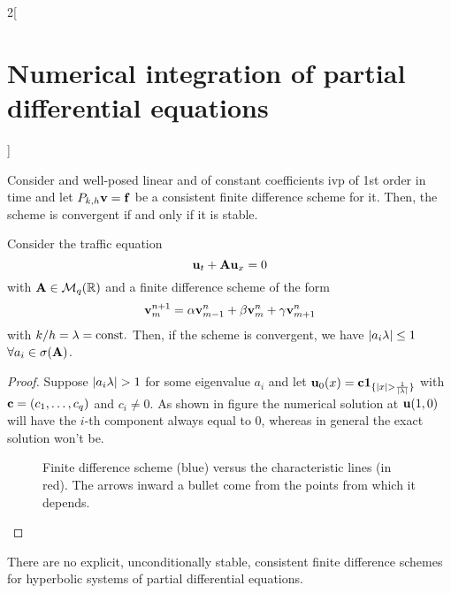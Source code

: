 \documentclass[../../../main_math.tex]{subfiles}
\begin{document}
\begin{multicols}{2}[\section{Numerical integration of partial differential equations}]
\begin{sproof}
  \end{sproof}
  \begin{theorem}
    Consider and well-posed linear and of constant coefficients ivp of 1st order in time and let $P_{k,h}\boldsymbol{\mathrm{v}}=\boldsymbol{\mathrm{f}}$ be a consistent finite difference scheme for it. Then, the scheme is convergent if and only if it is stable.
  \end{theorem}
  \begin{theorem}
    Consider the traffic equation $$\boldsymbol{\mathrm{u}}_t+\boldsymbol{\mathrm{A}}\boldsymbol{\mathrm{u}}_x=0$$ with $\boldsymbol{\mathrm{A}}\in\mathcal{M}_q(\mathbb{R})$ and a finite difference scheme of the form $$\boldsymbol{\mathrm{v}}_m^{n+1}=\alpha \boldsymbol{\mathrm{v}}_{m-1}^n+\beta \boldsymbol{\mathrm{v}}_m^n+\gamma \boldsymbol{\mathrm{v}}_{m+1}^n$$ with $k/h=\lambda=\text{const.}$ Then, if the scheme is convergent, we have $\abs{a_i\lambda}\leq 1$ $\forall a_i\in\sigma(\boldsymbol{\mathrm{A}})$.
  \end{theorem}
  \begin{proof}
    Suppose $\abs{a_i\lambda}>1$ for some eigenvalue $a_i$ and let $\boldsymbol{\mathrm{u}}_0(x)=\boldsymbol{\mathrm{c}}\boldsymbol{\mathrm{1}}_{\{\abs{x}> \frac{1}{\abs{\lambda}}\}}$ with $\boldsymbol{\mathrm{c}}=(c_1,\ldots,c_q)$ and $c_i\ne 0$. As shown in figure  the numerical solution at $\boldsymbol{\mathrm{u}}(1,0)$ will have the $i$-th component always equal to 0, whereas in general the exact solution won't be.
    \begin{figure}[H]
      \centering
      
      \caption{Finite difference scheme (blue) versus the characteristic lines (in red). The arrows inward a bullet come from the points from which it depends.}
      \label{NIPDE:courant-friedrichs-lewy_fig}
    \end{figure}
  \end{proof}
  \begin{theorem}
    There are no explicit, unconditionally stable, consistent finite difference schemes for hyperbolic systems of partial differential equations.
  \end{theorem}
\end{multicols}
\end{document}
